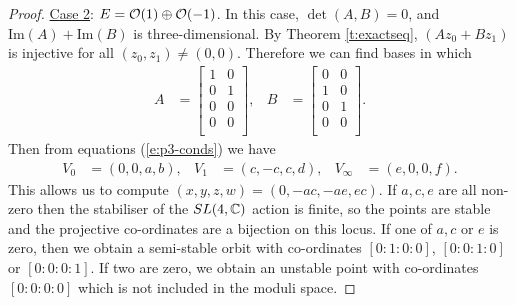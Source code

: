 \begin{proof}
		\underline{Case 2}: $E = \mathcal{O}(1)\oplus \mathcal{O}(-1)$. In this case, $\det(A,B)=0$, and $\text{Im}(A) + \text{Im}(B)$ is three-dimensional.  By Theorem \ref{t:exactseq}, $(Az_0+Bz_1)$ is injective for all $(z_0,z_1)\neq (0,0)$. Therefore we can find bases in which
		\begin{align*}
		A &= \begin{bmatrix}
		1 & 0\\
		0 & 1\\
		0 & 0\\
		0 & 0\\
		\end{bmatrix}, & 
		B &= \begin{bmatrix}
		0 & 0\\
		1 & 0\\
		0 & 1\\
		0 & 0\\
		\end{bmatrix}.
		\end{align*}
		Then from equations (\ref{e:p3-conds}) we have
		\begin{align}
			V_0 &= (0,0,a,b), & V_1 &= (c,-c,c,d), & V_\infty&= (e,0,0,f).
		\end{align}
		This allows us to compute $(x,y,z,w) = (0,-ac,-ae,ec)$. If $a,c,e$ are all non-zero then the stabiliser of the $SL(4,\mathbb{C})$ action is finite, so the points are stable and the projective co-ordinates are a bijection on this locus. If one of $a,c$ or $e$ is zero, then we obtain a semi-stable orbit with co-ordinates $[0:1:0:0]$, $[0:0:1:0]$ or $[0:0:0:1]$. If two are zero, we obtain an unstable point with co-ordinates $[0:0:0:0]$ which is not included in the moduli space.
		

\end{proof}
